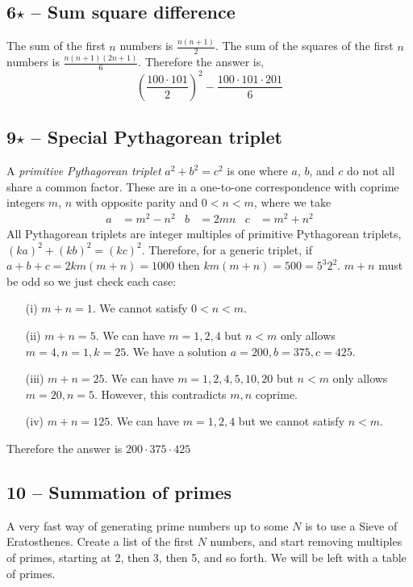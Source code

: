 \documentclass{article}
\begin{document}
\subsection*{6$\star$ -- Sum square difference} 
The sum of the first $n$ numbers is $\frac{n(n+1)}{2}$. 
The sum of the squares of the first $n$ numbers is $\frac{n(n+1)(2n+1)}{6}$. 
Therefore the answer is,
\[ \boxed{ \left(\frac{100 \cdot 101}{2}\right)^2 -  \frac{100 \cdot 101 \cdot 201}{6} } \]

\subsection*{9$\star$ -- Special Pythagorean triplet} 
A \emph{primitive Pythagorean triplet} $a^2 + b^2 = c^2$ is one where $a$, $b$, and $c$ do not all share a common factor.
These are in a one-to-one correspondence with coprime integers $m$, $n$ with opposite parity and $0 < n < m$, where we take
\begin{align*}
a &= m^2 - n^2 & b &= 2mn & c &= m^2+n^2
\end{align*}
All Pythagorean triplets are integer multiples of primitive Pythagorean triplets, $(ka)^2 + (kb)^2 = (kc)^2$.
Therefore, for a generic triplet, if $a+b+c = 2km(m+n) = 1000$ then $km(m+n) = 500 = 5^3 2^2$. 
$m+n$ must be odd so we just check each case:

\begin{itemize}
\item[(i)] $m+n = 1$. We cannot satisfy $0 < n < m$. 
\item[(ii)] $m+n = 5$. We can have $m = 1, 2, 4$ but $n < m$ only allows $m = 4, n = 1, k = 25$. We have a solution $a = 200, b = 375, c = 425$.
\item[(iii)] $m+n = 25$. We can have $m = 1, 2, 4, 5, 10, 20$ but $n < m$ only allows $m = 20, n = 5$. However, this contradicts $m,n$ coprime.
\item[(iv)] $m+n=125$. We can have $m = 1, 2, 4$ but we cannot satisfy $n < m$. 
\end{itemize}

Therefore the answer is $\boxed{ 200 \cdot 375 \cdot 425 }$

\subsection*{10 -- Summation of primes} 
A very fast way of generating prime numbers up to some $N$ is to use a Sieve of Eratosthenes. 
Create a list of the first $N$ numbers, and start removing multiples of primes, starting at 2, then 3, then 5, and so forth.
We will be left with a table of primes.
\end{document}
